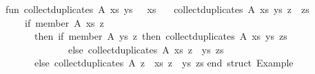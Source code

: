\begin{isabellebody}
\begin{isamarkuptext}
\begin{typewriter}
\isanewline
fun\ collect{\isacharunderscore}duplicates\ A{\isacharunderscore}\ xs\ ys\ {\isacharbrackleft}{\isacharbrackright}\ {\isacharequal}\ xs\isanewline
\ \ {\isacharbar}\ collect{\isacharunderscore}duplicates\ A{\isacharunderscore}\ xs\ ys\ {\isacharparenleft}z\ {\isacharcolon}{\isacharcolon}\ zs{\isacharparenright}\ {\isacharequal}\isanewline
\ \ \ \ {\isacharparenleft}if\ member\ A{\isacharunderscore}\ xs\ z\isanewline
\ \ \ \ \ \ then\ {\isacharparenleft}if\ member\ A{\isacharunderscore}\ ys\ z\ then\ collect{\isacharunderscore}duplicates\ A{\isacharunderscore}\ xs\ ys\ zs\isanewline
\ \ \ \ \ \ \ \ \ \ \ \ \ else\ collect{\isacharunderscore}duplicates\ A{\isacharunderscore}\ xs\ {\isacharparenleft}z\ {\isacharcolon}{\isacharcolon}\ ys{\isacharparenright}\ zs{\isacharparenright}\isanewline
\ \ \ \ \ \ else\ collect{\isacharunderscore}duplicates\ A{\isacharunderscore}\ {\isacharparenleft}z\ {\isacharcolon}{\isacharcolon}\ xs{\isacharparenright}\ {\isacharparenleft}z\ {\isacharcolon}{\isacharcolon}\ ys{\isacharparenright}\ zs{\isacharparenright}{\isacharsemicolon}\isanewline
\isanewline
end{\isacharsemicolon}\ {\isacharparenleft}{\isacharasterisk}struct\ Example{\isacharasterisk}{\isacharparenright}\isanewline


\end{typewriter}
\end{isamarkuptext}
\end{isabellebody}
